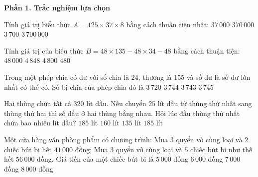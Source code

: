 \textbf{Phần 1. Trắc nghiệm lựa chọn}

\begin{ex} %
Tính giá trị biểu thức $A = 125 \times 37 \times 8$ bằng cách thuận tiện nhất:
\choice
{$37\,000$}
{\True $370\,000$}
{$3\,700$}
{$3\,700\,000$}
\end{ex}

\begin{ex} %
Tính giá trị của biểu thức $B = 48 \times 135 - 48 \times 34 - 48$ bằng cách thuận tiện:
\choice
{$48\,000$}
{$4\,848$}
{\True $4\,800$}
{$480$}
\end{ex}

\begin{ex} %
Trong một phép chia có dư với số chia là $24$, thương là $155$ và số dư là số dư lớn nhất có thể có. Số bị chia của phép chia đó là
\choice
{$3\,720$}
{$3\,744$}
{\True $3\,743$}
{$3\,745$}
\end{ex}

\begin{ex} %
Hai thùng chứa tất cả $320\text{ lít}$ dầu. Nếu chuyển $25\text{ lít}$ dầu từ thùng thứ nhất sang thùng thứ hai thì số dầu ở hai thùng bằng nhau. Hỏi lúc đầu thùng thứ nhất chứa bao nhiêu lít dầu?
\choice
{$185\text{ lít}$}
{$160\text{ lít}$}
{$135\text{ lít}$}
{\True $185\text{ lít}$}
\end{ex}

\begin{ex} %
Một cửa hàng văn phòng phẩm có chương trình: Mua $3$ quyển vở cùng loại và $2$ chiếc bút bi hết $41\,000$ đồng; Mua $3$ quyển vở cùng loại và $5$ chiếc bút bi như thế hết $56\,000$ đồng. Giá tiền của một chiếc bút bi là
\choice
{\True $5\,000$ đồng}
{$6\,000$ đồng}
{$7\,000$ đồng}
{$8\,000$ đồng}
\end{ex}

